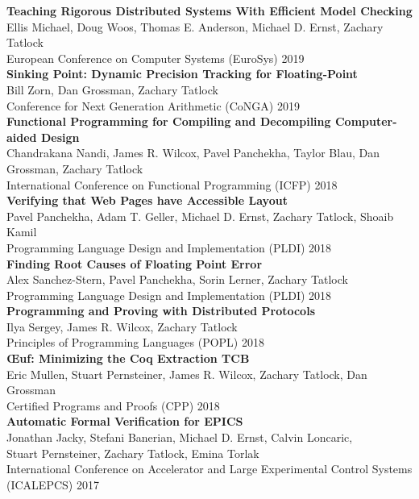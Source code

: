 \documentclass[10pt]{article}
\begin{document}
\textbf{%
Teaching Rigorous Distributed Systems With Efficient Model Checking
} \\
Ellis Michael, Doug Woos, Thomas E. Anderson, Michael D. Ernst, Zachary Tatlock \\
European Conference on Computer Systems (EuroSys) 2019 \\

\textbf{%
Sinking Point: Dynamic Precision Tracking for Floating-Point
} \\
Bill Zorn, Dan Grossman, Zachary Tatlock \\
Conference for Next Generation Arithmetic (CoNGA) 2019 \\

\textbf{%
Functional Programming for Compiling and Decompiling Computer-aided Design
} \\
Chandrakana Nandi, James R. Wilcox, Pavel Panchekha, Taylor Blau, Dan Grossman, Zachary Tatlock \\
International Conference on Functional Programming (ICFP) 2018 \\

\textbf{%
Verifying that Web Pages have Accessible Layout
} \\
Pavel Panchekha, Adam T. Geller, Michael D. Ernst, Zachary Tatlock, Shoaib Kamil \\
Programming Language Design and Implementation (PLDI) 2018 \\

\textbf{%
Finding Root Causes of Floating Point Error
} \\
Alex Sanchez-Stern, Pavel Panchekha, Sorin Lerner, Zachary Tatlock \\
Programming Language Design and Implementation (PLDI) 2018 \\

\textbf{%
Programming and Proving with Distributed Protocols
} \\
Ilya Sergey, James R. Wilcox, Zachary Tatlock \\
Principles of Programming Languages (POPL) 2018 \\

\textbf{%
Œuf: Minimizing the Coq Extraction TCB
} \\
Eric Mullen, Stuart Pernsteiner, James R. Wilcox, Zachary Tatlock, Dan Grossman \\
Certified Programs and Proofs (CPP) 2018 \\

\textbf{%
Automatic Formal Verification for EPICS
} \\
Jonathan Jacky, Stefani Banerian, Michael D. Ernst, Calvin Loncaric, \\
Stuart Pernsteiner, Zachary Tatlock, Emina Torlak \\
International Conference on Accelerator and Large Experimental Control Systems (ICALEPCS) 2017 \\
\end{document}
